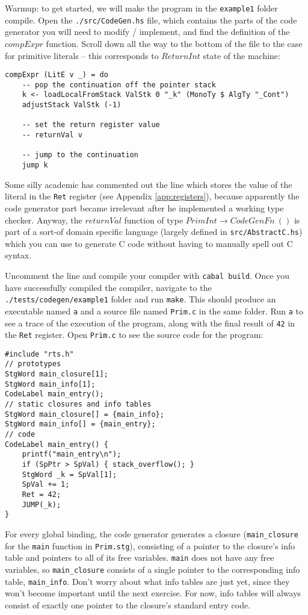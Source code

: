 \documentclass[10pt,a4paper]{exam} %
\begin{document}
\begin{questions}
\question Warmup: to get started, we will make the program in the \texttt{example1} folder compile. Open the \texttt{./src/CodeGen.hs} file, which contains the parts of the code generator you will need to modify / implement, and find the definition of the $\mathit{compExpr}$ function. Scroll down all the way to the bottom of the file to the case for primitive literals -- this corresponds to $\mathit{ReturnInt}$ state of the machine:
\begin{verbatim}
compExpr (LitE v _) = do
    -- pop the continuation off the pointer stack
    k <- loadLocalFromStack ValStk 0 "_k" (MonoTy $ AlgTy "_Cont")
    adjustStack ValStk (-1)

    -- set the return register value
    -- returnVal v

    -- jump to the continuation
    jump k
\end{verbatim}
Some silly academic has commented out the line which stores the value of the literal in the \texttt{Ret} register (see Appendix \ref{app:registers}), because apparently the code generator part became irrelevant after he implemented a working type checker. Anyway, the $\mathit{returnVal}$ function of type $\mathit{PrimInt} \to \mathit{CodeGenFn}~()$ is part of a sort-of domain specific language (largely defined in \texttt{src/AbstractC.hs}) which you can use to generate C code without having to manually spell out C syntax.

Uncomment the line and compile your compiler with \texttt{cabal build}. Once you have successfully compiled the compiler, navigate to the \texttt{./tests/codegen/example1} folder and run \texttt{make}. This should produce an executable named \texttt{a} and a source file named \texttt{Prim.c} in the same folder. Run \texttt{a} to see a trace of the execution of the program, along with the final result of \texttt{42} in the \texttt{Ret} register. Open \texttt{Prim.c} to see the source code for the program: 
\begin{verbatim}
#include "rts.h"
// prototypes
StgWord main_closure[1];
StgWord main_info[1];
CodeLabel main_entry();
// static closures and info tables
StgWord main_closure[] = {main_info};
StgWord main_info[] = {main_entry};
// code
CodeLabel main_entry() {
    printf("main_entry\n");
    if (SpPtr > SpVal) { stack_overflow(); }
    StgWord _k = SpVal[1];
    SpVal += 1;
    Ret = 42;
    JUMP(_k);
}
\end{verbatim}
For every global binding, the code generator generates a closure (\texttt{main\_closure} for the \texttt{main} function in \texttt{Prim.stg}), consisting of a pointer to the closure's info table and pointers to all of its free variables. \texttt{main} does not have any free variables, so \texttt{main\_closure} consists of a single pointer to the corresponding info table, \texttt{main\_info}. Don't worry about what info tables are just yet, since they won't become important until the next exercise. For now, info tables will always consist of exactly one pointer to the closure's standard entry code. 


\end{questions}
\end{document}
